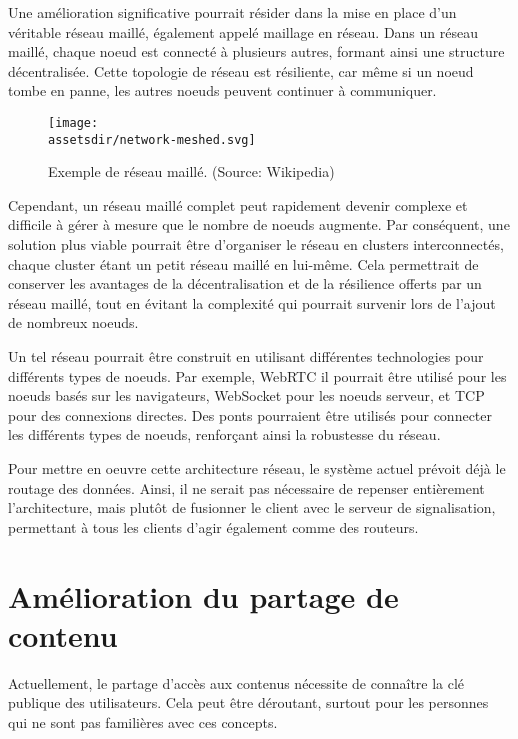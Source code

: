 Une amélioration significative pourrait résider dans la mise en place d'un véritable réseau maillé, également appelé maillage en réseau. Dans un réseau maillé, chaque noeud est connecté à plusieurs autres, formant ainsi une structure décentralisée. Cette topologie de réseau est résiliente, car même si un noeud tombe en panne, les autres noeuds peuvent continuer à communiquer.

\begin{wrapfigure}{l}{0.30\textwidth}
    \centering
    \texttt{[image: \\assetsdir/network-meshed.svg]}
    \caption{Exemple de réseau maillé. (Source: Wikipedia\cite{TopologieMesh2023})}
    \label{fig:network-meshed}
\end{wrapfigure}

Cependant, un réseau maillé complet peut rapidement devenir complexe et difficile à gérer à mesure que le nombre de noeuds augmente. Par conséquent, une solution plus viable pourrait être d'organiser le réseau en clusters interconnectés, chaque cluster étant un petit réseau maillé en lui-même. Cela permettrait de conserver les avantages de la décentralisation et de la résilience offerts par un réseau maillé, tout en évitant la complexité qui pourrait survenir lors de l'ajout de nombreux noeuds.

Un tel réseau pourrait être construit en utilisant différentes technologies pour différents types de noeuds. Par exemple, \Gls{WebRTC} il pourrait être utilisé pour les noeuds basés sur les navigateurs, \Gls{WebSocket} pour les noeuds serveur, et \Gls{TCP} pour des connexions directes. Des ponts pourraient être utilisés pour connecter les différents types de noeuds, renforçant ainsi la robustesse du réseau.

Pour mettre en oeuvre cette architecture réseau, le système actuel prévoit déjà le routage des données. Ainsi, il ne serait pas nécessaire de repenser entièrement l'architecture, mais plutôt de fusionner le client avec le serveur de signalisation, permettant à tous les clients d'agir également comme des routeurs.

\section{Amélioration du partage de contenu}

Actuellement, le partage d'accès aux contenus nécessite de connaître la clé publique des utilisateurs. Cela peut être déroutant, surtout pour les personnes qui ne sont pas familières avec ces concepts.

